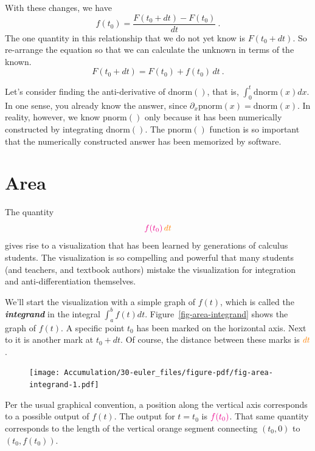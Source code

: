 \documentclass[
  letterpaper,
  DIV=11,
  numbers=noendperiod,
  oneside]{scrreprt}
\newcommand{\pnorm}{\text{pnorm}}
\newcommand{\dnorm}{\text{dnorm}}
\begin{document}
With these changes, we have
\[f(t_0) = \frac{F(t_0+dt) - F(t_0)}{dt}\ .\] The one quantity in this
relationship that we do not yet know is \(F(t_0 + dt)\). So re-arrange
the equation so that we can calculate the unknown in terms of the known.
\[F(t_0 + dt) = F(t_0) + f(t_0)\, dt\ .\]

Let's consider finding the anti-derivative of \(\dnorm()\), that is,
\(\int_0^t \dnorm(x) dx\). In one sense, you already know the answer,
since \(\partial_x \pnorm(x) = \dnorm(x)\). In reality, however, we know
\(\pnorm()\) only because it has been numerically constructed by
integrating \(\dnorm()\). The \(\pnorm()\) function is so important that
the numerically constructed answer has been memorized by software.

\hypertarget{area}{%
\section{Area}\label{area}}

The quantity \[\Large \color{magenta}{f(t_0)}\, \color{orange}{dt}\]
gives rise to a visualization that has been learned by generations of
calculus students. The visualization is so compelling and powerful that
many students (and teachers, and textbook authors) mistake the
visualization for integration and anti-differentiation themselves.

We'll start the visualization with a simple graph of \(f(t)\), which is
called the \textbf{\emph{integrand}} in the integral
\(\int_a^b f(t) dt\). Figure~\ref{fig-area-integrand} shows the graph of
\(f(t)\). A specific point \(t_0\) has been marked on the horizontal
axis. Next to it is another mark at \(t_0 + dt\). Of course, the
distance between these marks is \(\color{orange}{dt}\).

\begin{figure}


{\centering \texttt{[image: Accumulation/30-euler\_files/figure-pdf/fig-area-integrand-1.pdf]}

}

\end{figure}

Per the usual graphical convention, a position along the vertical axis
corresponds to a possible output of \(f(t)\). The output for \(t=t_0\)
is \(\color{magenta}{f(t_0)}\). That same quantity corresponds to the
length of the vertical orange segment connecting \((t_0, 0)\) to
\((t_0, f(t_0))\).
\end{document}
